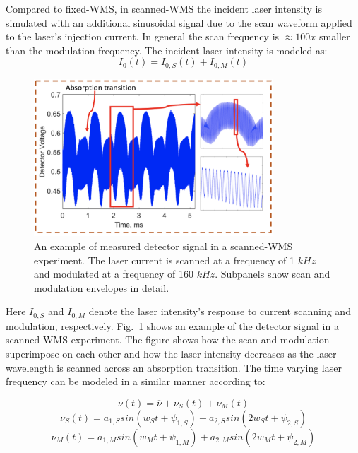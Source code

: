 Compared to fixed-WMS, in scanned-WMS the incident laser intensity is simulated with an additional sinusoidal signal due to the scan waveform applied to the laser's injection current. In general the scan frequency is $\approx100x$ smaller than the modulation frequency. The incident laser intensity is modeled as:
\begin{equation}
I_0(t)=I_{0,S}(t)+I_{0,M}(t)
\end{equation}

\begin{figure}[b]
    \centering
        \includegraphics[trim = 0mm 0mm 0mm 0mm, clip=true, width=0.8\textwidth]{fig/ch3_fig3_v2.png}
        \caption{An example of measured detector signal in a scanned-WMS experiment. The laser current is scanned at a frequency of 1 $kHz$ and modulated at a frequency of 160 $kHz$. Subpanels show scan and modulation envelopes in detail.}
    \label{fig:ch3_2}
\end{figure}

\noindent Here $I_{0,S}$ and $I_{0,M}$ denote the laser intensity's response to current scanning and modulation, respectively. Fig.\ \ref{fig:ch3_2} shows an example of the detector signal in a scanned-WMS experiment. The figure shows how the scan and modulation superimpose on each other and how the laser intensity decreases as the laser wavelength is scanned across an absorption transition. The time varying laser frequency can be modeled in a similar manner according to:

\begin{equation}
\nu(t)=\overline{\nu}+\nu_S(t)+\nu_M(t)
\end{equation}
\vspace{-6mm}
\begin{equation}
\nu_S(t)=a_{1,S}sin(w_St+\psi_{1,S})+a_{2,S}sin(2w_St+\psi_{2,S})
\end{equation}
\vspace{-6mm}
\begin{equation}
\nu_M(t)=a_{1,M}sin(w_Mt+\psi_{1,M})+a_{2,M}sin(2w_Mt+\psi_{2,M})
\end{equation}

